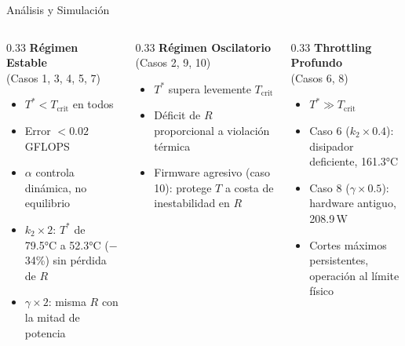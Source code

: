 \documentclass[aspectratio=169, 10pt]{beamer}
\newcommand{\tcrit}{T_{\text{crit}}}
\begin{document}
\begin{frame}{Análisis y Simulación}
  \begin{columns}[t]
    \begin{column}{0.33\textwidth}
      \textcolor{good}{\small\textbf{Régimen Estable}}\\
      \scriptsize (Casos 1, 3, 4, 5, 7)\\[4pt]
      \small
      \begin{itemize}\setlength\itemsep{3pt}
        \item $T^* < \tcrit$ en todos
        \item Error $<0.02$\,GFLOPS
        \item $\alpha$ controla dinámica, no equilibrio
        \item $k_2 {\times}2$: $T^*$ de 79.5°C a 52.3°C ($-$34\%) sin pérdida de $R$
        \item $\gamma {\times}2$: misma $R$ con la mitad de potencia
      \end{itemize}
    \end{column}
    \begin{column}{0.33\textwidth}
      \textcolor{bad}{\small\textbf{Régimen Oscilatorio}}\\
      \scriptsize (Casos 2, 9, 10)\\[4pt]
      \small
      \begin{itemize}\setlength\itemsep{3pt}
        \item $T^*$ supera levemente $\tcrit$
        \item Déficit de $R$ proporcional a violación térmica
        \item Firmware agresivo (caso 10): protege $T$ a costa de inestabilidad en $R$
      \end{itemize}
    \end{column}
    \begin{column}{0.33\textwidth}
      \textcolor{warn}{\small\textbf{Throttling Profundo}}\\
      \scriptsize (Casos 6, 8)\\[4pt]
      \small
      \begin{itemize}\setlength\itemsep{3pt}
        \item $T^* \gg \tcrit$
        \item Caso 6 ($k_2{\times}0.4$): disipador deficiente, 161.3°C
        \item Caso 8 ($\gamma{\times}0.5$): hardware antiguo, 208.9\,W
        \item Cortes máximos persistentes, operación al límite físico

\end{itemize}
\end{column}
\end{columns}
\end{frame}
\end{document}
